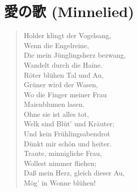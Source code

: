 
\section{愛の歌 (Minnelied)}

\begin{quote}
	Holder klingt der Vogelsang, \\
	Wenn die Engelreine, \\
	Die mein Jünglingsherz bezwang, \\
	Wandelt durch die Haine. \\

	Röter blühen Tal und Au, \\
	Grüner wird der Wasen, \\
	Wo die Finger meiner Frau \\
	Maienblumen lasen. \\

	Ohne sie ist alles tot, \\
	Welk sind Blüt' und Kräuter; \\
	Und kein Frühlingsabendrot \\
	Dünkt mir schön und heiter. \\

	Traute, minnigliche Frau, \\
	Wollest nimmer fliehen; \\
	Daß mein Herz, gleich dieser Au, \\
	Mög' in Wonne blühen!
\end{quote}
